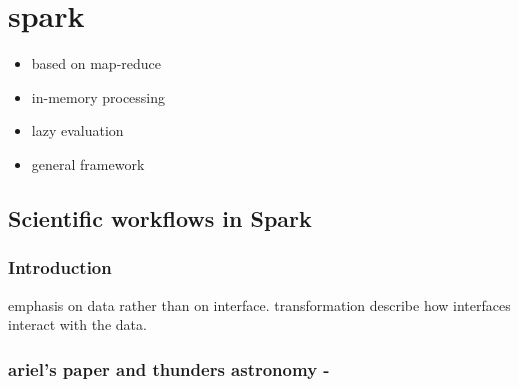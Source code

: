 \documentclass{report}
\begin{document}
    \section{spark} 
        \begin{itemize} 
            \item based on map-reduce 
            \item in-memory processing 
            \item lazy evaluation 
            \item general framework 
        \end{itemize} 

    \subsection{Scientific workflows in Spark} 
        \subsubsection{Introduction}
            emphasis on data rather than on interface. transformation describe 
            how interfaces interact with the data.  
        \subsubsection{ariel's paper and thunders astronomy - } 
\end{document}
